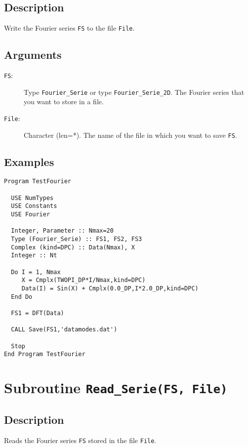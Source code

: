 \subsection{Description}

Write the Fourier series \texttt{FS} to the file \texttt{File}.

\subsection{Arguments}

\begin{description}
\item[\texttt{FS}:] Type \texttt{Fourier\_Serie} or type
  \texttt{Fourier\_Serie\_2D}. The Fourier series that you want to
  store in a file.
\item[\texttt{File}:] Character (len=*). The name of the file in which
  you want to save \texttt{FS}.
\end{description}

\subsection{Examples}

\begin{verbatim}
Program TestFourier

  USE NumTypes
  USE Constants
  USE Fourier

  Integer, Parameter :: Nmax=20
  Type (Fourier_Serie) :: FS1, FS2, FS3
  Complex (kind=DPC) :: Data(Nmax), X
  Integer :: Nt

  Do I = 1, Nmax
     X = Cmplx(TWOPI_DP*I/Nmax,kind=DPC)
     Data(I) = Sin(X) + Cmplx(0.0_DP,I*2.0_DP,kind=DPC)
  End Do

  FS1 = DFT(Data)

  CALL Save(FS1,'datamodes.dat')

  Stop
End Program TestFourier
\end{verbatim}

\section{Subroutine \texttt{Read\_Serie(FS, File)}}

\subsection{Description}

Reads the Fourier series \texttt{FS} stored in the file \texttt{File}.

